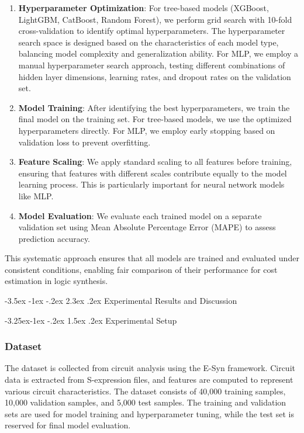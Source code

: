 \documentclass[10pt,twocolumn]{article}
\makeatletter
\renewcommand\section{\@startsection {section}{1}{\z@}%
                                   {-3.5ex \@plus -1ex \@minus -.2ex}%
                                   {2.3ex \@plus.2ex}%
                                   {\normalfont\large\bfseries}}
\renewcommand\subsection{\@startsection{subsection}{2}{\z@}%
                                     {-3.25ex\@plus -1ex \@minus -.2ex}%
                                     {1.5ex \@plus .2ex}%
                                     {\normalfont\normalsize\bfseries}}
\makeatother
\begin{document}
\begin{enumerate}
\item \textbf{Hyperparameter Optimization}: For tree-based models (XGBoost, LightGBM, CatBoost, Random Forest), we perform grid search with 10-fold cross-validation to identify optimal hyperparameters. The hyperparameter search space is designed based on the characteristics of each model type, balancing model complexity and generalization ability. For MLP, we employ a manual hyperparameter search approach, testing different combinations of hidden layer dimensions, learning rates, and dropout rates on the validation set.

\item \textbf{Model Training}: After identifying the best hyperparameters, we train the final model on the training set. For tree-based models, we use the optimized hyperparameters directly. For MLP, we employ early stopping based on validation loss to prevent overfitting.

\item \textbf{Feature Scaling}: We apply standard scaling to all features before training, ensuring that features with different scales contribute equally to the model learning process. This is particularly important for neural network models like MLP.

\item \textbf{Model Evaluation}: We evaluate each trained model on a separate validation set using Mean Absolute Percentage Error (MAPE) to assess prediction accuracy.
\end{enumerate}

This systematic approach ensures that all models are trained and evaluated under consistent conditions, enabling fair comparison of their performance for cost estimation in logic synthesis.

\section{Experimental Results and Discussion}

\subsection{Experimental Setup}

\subsubsection{Dataset}
The dataset is collected from circuit analysis using the E-Syn framework. Circuit data is extracted from S-expression files, and features are computed to represent various circuit characteristics. The dataset consists of 40,000 training samples, 10,000 validation samples, and 5,000 test samples. The training and validation sets are used for model training and hyperparameter tuning, while the test set is reserved for final model evaluation.
\end{document}
